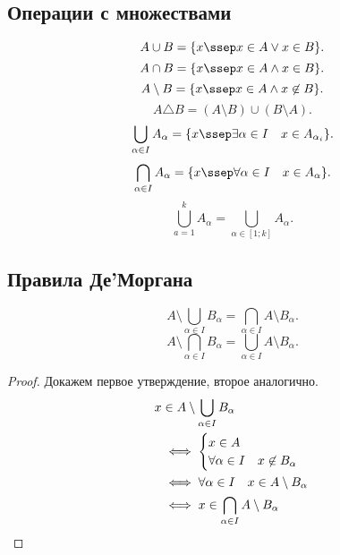 \documentclass[11pt, oneside]{article}   	%
\begin{document}
    \subsection{Операции с множествами}
        \[ A\cup B = \{x\ssep x \in A \lor x \in B\}  .\]
        \[ A\cap B = \{x\ssep x \in A\land x \in B\}  .\] 
        \[ A\setminus B = \{x\ssep x \in A\land x \not\in B\}   .\] 
        \[ A\triangle B = \left( A\setminus B  \right)\cup\left( B\setminus A \right)   .\]
        \[ \bigcup\limits_{\alpha \in I}A_{\alpha} = \{x \ssep \exists{\alpha \in I}\quad x \in A_{\alpha_i}\} .\]
        \[ \bigcap\limits_{\alpha \in I}A_{\alpha} = \{x \ssep \forall{\alpha \in I}\quad x \in A_{\alpha}\}  .\] 
        \[ \bigcup\limits_{a=1}^kA_{\alpha} = \bigcup\limits_{\alpha \in \left[1; k\right]}A_{\alpha} .\]
    \subsection{Правила Де'Моргана}
        \begin{theorem}
            \[ A\setminus \bigcup_{\alpha\in I} B_{\alpha} = \bigcap_{\alpha\in I} A \setminus B_{\alpha} .\] 
            \[ A \setminus \bigcap_{\alpha\in I} B_{\alpha} = \bigcup_{\alpha\in I} A \setminus B_{\alpha}.\]
            \begin{proof}
                Докажем первое утверждение, второе аналогично.\\
                \begin{equation*}
                    \begin{split}
                        x&\in A \setminus \bigcup_{\alpha\in I} B_{\alpha}\\
                         &\iff \begin{cases}
                             x\in A\\
                             \forall{\alpha\in I}\quad x \not\in B_{\alpha}
                         \end{cases}\\
                         &\iff \forall{\alpha\in I}\quad x \in A \setminus B_{\alpha}\\
                         &\iff x\in \bigcap_{\alpha\in I} A \setminus B_{\alpha} \qedhere
                    \end{split}
                \end{equation*}
            \end{proof}
        \end{theorem}            
\end{document}
